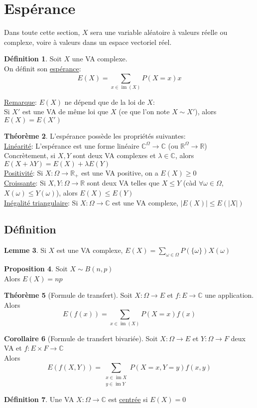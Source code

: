 \documentclass[10pt,a4paper]{article}
\theoremstyle{definition}
\newtheorem{proposition}{Proposition}[section]
\newtheorem{theorem}[proposition]{Théorème}
\newtheorem{corollaire}[proposition]{Corollaire}
\newtheorem{lemme}[proposition]{Lemme}
\newtheorem{definition}[proposition]{Définition}
\DeclareMathOperator{\im}{im}
\begin{document}
\section{Espérance}
Dans toute cette section, $X$ sera une variable aléatoire à valeurs réelle ou complexe, voire à valeurs dans un espace vectoriel réel.
\begin{definition}
Soit $X$ une VA complexe. \\
On définit son \uline{espérance}: 
\[E(X) = \sum\limits_{x \in \im(X)} P(X = x)x\]
\end{definition}
\noindent \uline{Remarque}: $E(X)$ ne dépend que de la loi de $X$: \\
Si $X'$ est une VA de même loi que $X$ (ce que l'on note $X \sim X'$), alors $E(X) = E(X')$
\begin{theorem}
L'espérance possède les propriétés suivantes: \\
\uline{Linéarité}: L'espérance est une forme linéaire $\mathbb{C}^\Omega \to \mathbb{C}$ (ou $\mathbb{R}^\Omega \to \mathbb{R}$) \\
Concrètement, si $X, Y$ sont deux VA complexes et $\lambda \in \mathbb{C}$, alors $E(X + \lambda Y) = E(X) + \lambda E(Y)$ \\
\uline{Positivité}: Si $X: \Omega \to \mathbb{R}_+$ est une VA positive, on a $E(X) \geq 0$ \\
\uline{Croissante}: Si $X, Y: \Omega \to \mathbb{R}$ sont deux VA telles que $X \leq Y$ (càd $\forall \omega \in \Omega$, $X(\omega) \leq Y(\omega)$), alors $E(X) \leq E(Y)$ \\
\uline{Inégalité triangulaire}: Si $X: \Omega \to \mathbb{C}$ est une VA complexe, $|E(X)| \leq E(|X|)$
\end{theorem}
\subsection{Définition}
\begin{lemme}
Si $X$ est une VA complexe, $E(X) = \sum\limits_{\omega \in \Omega} P(\{\omega\})X(\omega)$
\end{lemme}
\begin{proposition}
Soit $X \sim B(n, p)$ \\
Alors $E(X) = np$
\end{proposition}
\begin{theorem}[Formule de transfert]
Soit $X: \Omega \to E$ et $f:E \to \mathbb{C}$ une application. \\
Alors
\[E(f(x)) = \sum\limits_{x \in \im(X)}P(X = x)f(x)\]
\end{theorem}
\begin{corollaire}[Formule de transfert bivariée]
Soit $X: \Omega \to E$ et $Y: \Omega \to F$ deux VA et $f: E \times F \to \mathbb{C}$ \\
Alors
\[E(f(X, Y)) = \sum\limits_{\substack{x \in \im X \\ y \in \im Y}} P(X = x, Y = y)f(x, y) \]
\end{corollaire}
\begin{definition}
Une VA $X: \Omega \to \mathbb{C}$ est \uline{centrée} si $E(X) = 0$
\end{definition}
\end{document}
